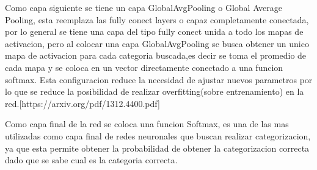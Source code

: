 Como capa siguiente se tiene un capa GlobalAvgPooling o Global Average Pooling, esta reemplaza las fully conect layers o capaz completamente
conectada, por lo general se tiene una capa del tipo fully conect unida a todo los mapas de activacion, pero al colocar una capa GlobalAvgPooling
se busca obtener un unico mapa de activacion para cada categoria buscada,es decir se toma el promedio de cada mapa y se coloca en un vector directamente
conectado a una funcion softmax. Esta configuracion reduce la necesidad de ajustar nuevos parametros por lo que se reduce la posibilidad de
realizar overfitting(sobre entrenamiento) en la red.[https://arxiv.org/pdf/1312.4400.pdf]

Como capa final de la red se coloca una funcion Softmax, es una de las mas utilizadas como capa final de redes neuronales que buscan realizar
categorizacion, ya que esta permite obtener la probabilidad de obtener la categorizacion correcta dado que se sabe cual es la categoria correcta.

